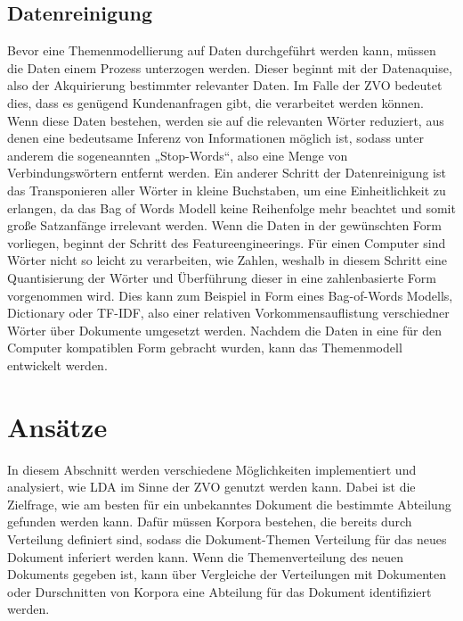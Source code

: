 \documentclass[german,version-2020-11]{uzl-thesis}
\begin{document}
\subsection{Datenreinigung}
Bevor eine Themenmodellierung auf Daten durchgeführt werden kann, müssen die Daten einem Prozess unterzogen werden. Dieser beginnt mit der Datenaquise, also der Akquirierung bestimmter relevanter Daten. Im Falle der ZVO bedeutet dies, dass es genügend Kundenanfragen gibt, die verarbeitet werden können. Wenn diese Daten bestehen, werden sie auf die relevanten Wörter reduziert, aus denen eine bedeutsame Inferenz von Informationen möglich ist, sodass unter anderem die sogeneannten „Stop-Words“, also eine Menge von Verbindungswörtern entfernt werden. Ein anderer Schritt der Datenreinigung ist das Transponieren aller Wörter in kleine Buchstaben, um eine Einheitlichkeit zu erlangen, da das Bag of Words Modell keine Reihenfolge mehr beachtet und somit große Satzanfänge irrelevant werden. Wenn die Daten in der gewünschten Form vorliegen, beginnt der Schritt des Featureengineerings. Für einen Computer sind Wörter nicht so leicht zu verarbeiten, wie Zahlen, weshalb in diesem Schritt eine Quantisierung der Wörter und Überführung dieser in eine zahlenbasierte Form vorgenommen wird. Dies kann zum Beispiel in Form eines Bag-of-Words Modells, Dictionary oder TF-IDF, also einer relativen Vorkommensauflistung verschiedner Wörter über Dokumente umgesetzt werden. Nachdem die Daten in eine für den Computer kompatiblen Form gebracht wurden, kann das Themenmodell entwickelt werden. 

\section{Ansätze}
In diesem Abschnitt werden verschiedene Möglichkeiten implementiert und analysiert, wie LDA im Sinne der ZVO genutzt werden kann. Dabei ist die Zielfrage, wie am besten für ein unbekanntes Dokument die bestimmte Abteilung gefunden werden kann. Dafür müssen Korpora bestehen, die bereits durch Verteilung definiert sind, sodass die Dokument-Themen Verteilung für das neues Dokument inferiert werden kann. Wenn die Themenverteilung des neuen Dokuments gegeben ist, kann über Vergleiche der Verteilungen mit Dokumenten oder Durschnitten von Korpora eine Abteilung für das Dokument identifiziert werden. 
\end{document}
